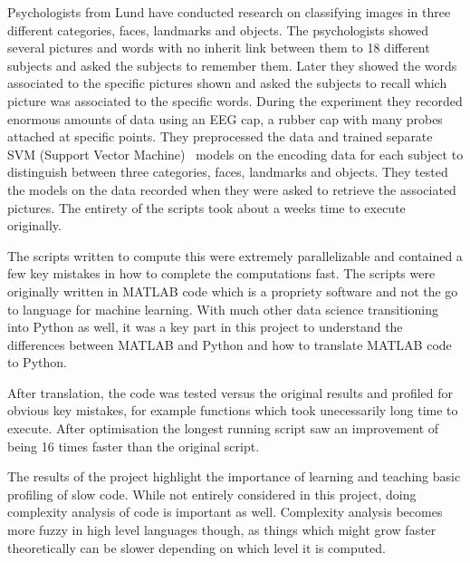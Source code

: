\documentclass[12pt, a4paper]{article}
\begin{document}
Psychologists from Lund have conducted research on classifying images in three different categories, faces, landmarks and objects.
The psychologists showed several pictures and words with no inherit link between them to 18 different subjects and asked the subjects to remember them.
Later they showed the words associated to the specific pictures shown and asked the subjects to recall which picture was associated to the specific words.
During the experiment they recorded enormous amounts of data using an EEG cap, a rubber cap with many probes attached at specific points.
They preprocessed the data and trained separate SVM (Support Vector Machine)~\cite{wiki:SVM} models on the encoding data for each subject to distinguish between three categories, faces, landmarks and objects.
They tested the models on the data recorded when they were asked to retrieve the associated pictures.
The entirety of the scripts took about a weeks time to execute originally.\par 

The scripts written to compute this were extremely parallelizable and contained a few key mistakes in how to complete the computations fast.
The scripts were originally written in MATLAB code which is a propriety software and not the go to language for machine learning.
With much other data science transitioning into Python as well, it was a key part in this project to understand the differences between MATLAB and Python and how to translate MATLAB code to Python.\par

After translation, the code was tested versus the original results and profiled for obvious key mistakes, for example functions which took unecessarily long time to execute.
After optimisation the longest running script saw an improvement of being 16 times faster than the original script.

The results of the project highlight the importance of learning and teaching basic profiling of slow code.
While not entirely considered in this project, doing complexity analysis of code is important as well.
Complexity analysis becomes more fuzzy in high level languages though, as things which might grow faster theoretically can be slower depending on which level it is computed.


\newpage


\tableofcontents

\clearpage
\end{document}
